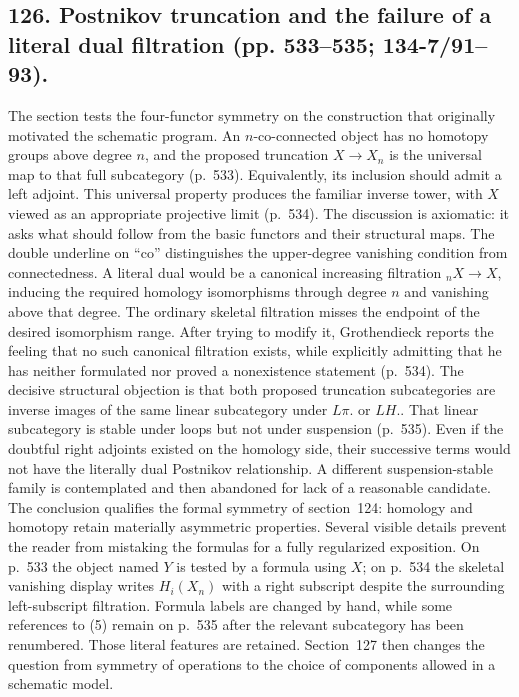 \documentclass[10pt,oneside]{book}
\begin{document}
\subsection*{126. Postnikov truncation and the failure of a literal dual filtration (pp. 533--535; 134-7/91--93).}
The section tests the four-functor symmetry on the construction that originally motivated the schematic program. An $n$-co-connected object has no homotopy groups above degree $n$, and the proposed truncation $X\to X_n$ is the universal map to that full subcategory (p.~533). Equivalently, its inclusion should admit a left adjoint. This universal property produces the familiar inverse tower, with $X$ viewed as an appropriate projective limit (p.~534). The discussion is axiomatic: it asks what should follow from the basic functors and their structural maps. The double underline on ``co'' distinguishes the upper-degree vanishing condition from connectedness. A literal dual would be a canonical increasing filtration ${}_nX\to X$, inducing the required homology isomorphisms through degree $n$ and vanishing above that degree. The ordinary skeletal filtration misses the endpoint of the desired isomorphism range. After trying to modify it, Grothendieck reports the feeling that no such canonical filtration exists, while explicitly admitting that he has neither formulated nor proved a nonexistence statement (p.~534). The decisive structural objection is that both proposed truncation subcategories are inverse images of the same linear subcategory under $L\pi.$ or $LH.$. That linear subcategory is stable under loops but not under suspension (p.~535). Even if the doubtful right adjoints existed on the homology side, their successive terms would not have the literally dual Postnikov relationship. A different suspension-stable family is contemplated and then abandoned for lack of a reasonable candidate. The conclusion qualifies the formal symmetry of section~124: homology and homotopy retain materially asymmetric properties. Several visible details prevent the reader from mistaking the formulas for a fully regularized exposition. On p.~533 the object named $Y$ is tested by a formula using $X$; on p.~534 the skeletal vanishing display writes $H_i(X_n)$ with a right subscript despite the surrounding left-subscript filtration. Formula labels are changed by hand, while some references to (5) remain on p.~535 after the relevant subcategory has been renumbered. Those literal features are retained. Section~127 then changes the question from symmetry of operations to the choice of components allowed in a schematic model.
\end{document}

